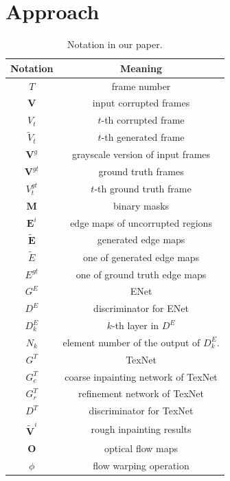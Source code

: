 

\section{Approach}\label{sec:approach}





\begin{table}[t]
	\caption{Notation in our paper. }\smallskip
	\scriptsize
	\centering
	{
		\smallskip\begin{tabular}{c|c}
			\hline
			Notation & Meaning \\
			\hline
			$T$ & frame number \\
			\hline
			$\boldsymbol{V}$ & input corrupted frames \\
			\hline
			$V_t$ & $t$-th corrupted frame \\
			\hline
			$\widetilde{V}_t$ & $t$-th generated frame \\
			\hline
			$\boldsymbol{V}^{g}$ & grayscale version of input frames \\
			\hline
			$\boldsymbol{V}^{gt}$ & ground truth frames \\
			\hline
			$V^{gt}_t$ & $t$-th ground truth frame \\
			\hline
			$\boldsymbol{M}$ & binary masks \\
			\hline
			$\boldsymbol{E}^{i}$ & edge maps of uncorrupted regions \\
			\hline
		 	$\boldsymbol{\widetilde{E}}$ & generated edge maps \\
		 	\hline
		 	$\widetilde{E}$ & one of generated edge maps \\
		 	\hline
		 	${E}^{gt}$ & one of ground truth edge maps \\
		 	\hline
		 	$G^E$ & ENet \\
		 	\hline
		 	$D^E$ & discriminator for ENet \\
		 	\hline
		 	$D^E_k$ & $k$-th layer in $D^E$ \\
		 	\hline
		 	$N_k$ & element number of the output of $D^E_k$. \\
		 	\hline
		 	$G^T$ & TexNet \\
		 	\hline
		 	$G_c^T$ & coarse inpainting network of TexNet \\
		 	\hline
		 	$G_r^T$ & refinement network of TexNet \\
		 	\hline
		 	$D^T$ & discriminator for TexNet \\
		 	\hline
		 	$\boldsymbol{\widetilde{V}}^i$ & rough inpainting results \\
		 	\hline
		 	$\boldsymbol{O}$ & optical flow maps \\
		 	\hline
		 	$\phi$ & flow warping operation \\
		 	\hline
			
			
		\end{tabular}
	}
	\label{tab:notation}
\end{table}






